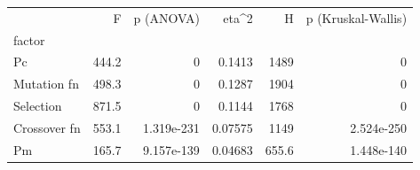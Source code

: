\begin{tabular}{lrrrrr}
\toprule
 & F & p (ANOVA) & eta^2 & H & p (Kruskal-Wallis) \\
factor &  &  &  &  &  \\
\midrule
Pc & 444.2 & 0 & 0.1413 & 1489 & 0 \\
Mutation fn & 498.3 & 0 & 0.1287 & 1904 & 0 \\
Selection & 871.5 & 0 & 0.1144 & 1768 & 0 \\
Crossover fn & 553.1 & 1.319e-231 & 0.07575 & 1149 & 2.524e-250 \\
Pm & 165.7 & 9.157e-139 & 0.04683 & 655.6 & 1.448e-140 \\
\bottomrule
\end{tabular}
